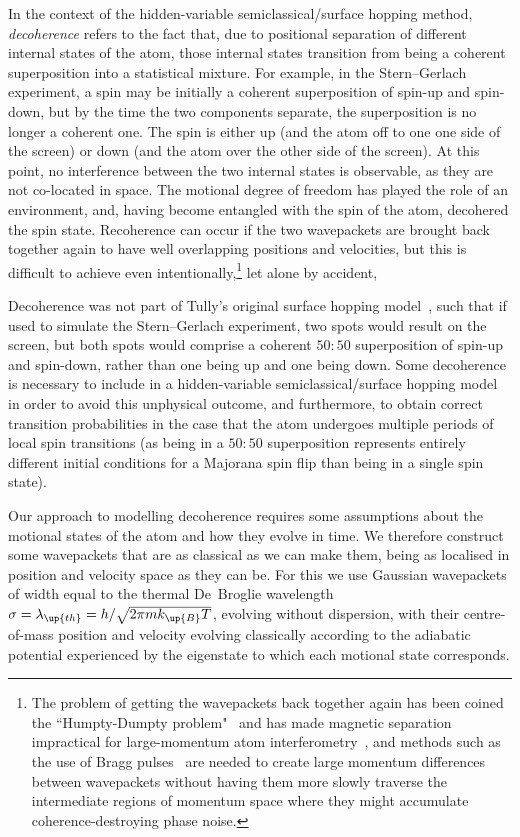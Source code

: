In the context of the hidden-variable semiclassical/surface hopping method, \emph{decoherence} refers to the fact that, due to positional separation of different internal states of the atom, those internal states transition from being a coherent superposition into a statistical mixture. For example, in the Stern--Gerlach experiment, a spin may be initially a coherent superposition of spin-up and spin-down, but by the time the two components separate, the superposition is no longer a coherent one. The spin is either up (and the atom off to one one side of the screen) or down (and the atom over the other side of the screen). At this point, no interference between the two internal states is observable, as they are not co-located in space. The motional degree of freedom has played the role of an environment, and, having become entangled with the spin of the atom, decohered the spin state. Recoherence can occur if the two wavepackets are brought back together again to have well overlapping positions and velocities, but this is difficult to achieve even intentionally,\footnote{The problem of getting the wavepackets back together again has been coined the ``Humpty-Dumpty problem"~\cite{Schwinger1988, doi:10.1063/1.459170} and has made magnetic separation impractical for large-momentum atom interferometry~\cite{machluf_coherent_2013}, and methods such as the use of Bragg pulses~\cite{PhysRevLett.66.2693, PhysRevLett.75.2633} are needed to create large momentum differences between wavepackets without having them more slowly traverse the intermediate regions of momentum space where they might accumulate coherence-destroying phase noise.} let alone by accident, 

Decoherence was not part of Tully's original surface hopping model~\cite{doi:10.1063/1.459170}, such that if used to simulate the Stern--Gerlach experiment, two spots would result on the screen, but both spots would comprise a coherent $50:50$ superposition of spin-up and spin-down, rather than one being up and one being down. Some decoherence is necessary to include in a hidden-variable semiclassical/surface hopping model in order to avoid this unphysical outcome, and furthermore, to obtain correct transition probabilities in the case that the atom undergoes multiple periods of local spin transitions (as being in a $50:50$ superposition represents entirely different initial conditions for a Majorana spin flip than being in a single spin state).

Our approach to modelling decoherence requires some assumptions about the motional states of the atom and how they evolve in time. We therefore construct some wavepackets that are as classical as we can make them, being as localised in position and velocity space as they can be. For this we use Gaussian wavepackets of width equal to the thermal De~Broglie wavelength $\sigma = \lambda_\up{th} = h/\sqrt{2\pi m k_\up{B} T}$, evolving without dispersion, with their centre-of-mass position and velocity evolving classically according to the adiabatic potential experienced by the eigenstate to which each motional state corresponds.

